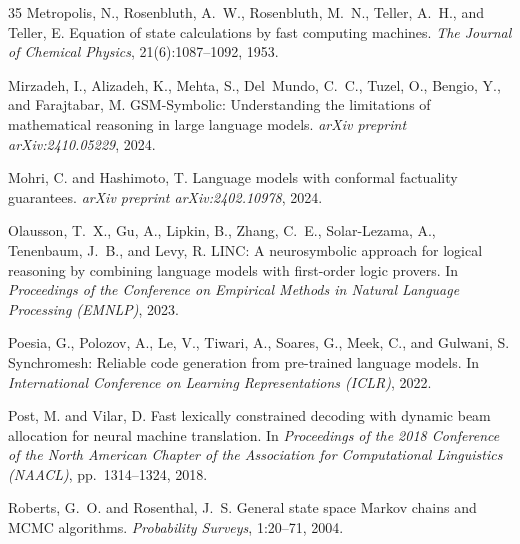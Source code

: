 \documentclass[twoside,11pt]{article}
\begin{document}
\begin{thebibliography}{35}
Metropolis, N., Rosenbluth, A.~W., Rosenbluth, M.~N., Teller, A.~H., and
Teller, E.
\newblock Equation of state calculations by fast computing machines.
\newblock \emph{The Journal of Chemical Physics}, 21(6):1087--1092, 1953.

Mirzadeh, I., Alizadeh, K., Mehta, S., Del~Mundo, C.~C., Tuzel, O.,
Bengio, Y., and Farajtabar, M.
\newblock GSM-Symbolic: Understanding the limitations of mathematical
reasoning in large language models.
\newblock \emph{arXiv preprint arXiv:2410.05229}, 2024.

Mohri, C. and Hashimoto, T.
\newblock Language models with conformal factuality guarantees.
\newblock \emph{arXiv preprint arXiv:2402.10978}, 2024.

Olausson, T.~X., Gu, A., Lipkin, B., Zhang, C.~E., Solar-Lezama, A.,
Tenenbaum, J.~B., and Levy, R.
\newblock LINC: A neurosymbolic approach for logical reasoning by combining
language models with first-order logic provers.
\newblock In \emph{Proceedings of the Conference on Empirical Methods in
Natural Language Processing (EMNLP)}, 2023.

Poesia, G., Polozov, A., Le, V., Tiwari, A., Soares, G., Meek, C., and
Gulwani, S.
\newblock Synchromesh: Reliable code generation from pre-trained language
models.
\newblock In \emph{International Conference on Learning Representations
(ICLR)}, 2022.

Post, M. and Vilar, D.
\newblock Fast lexically constrained decoding with dynamic beam allocation
for neural machine translation.
\newblock In \emph{Proceedings of the 2018 Conference of the North American
Chapter of the Association for Computational Linguistics (NAACL)}, pp.\
1314--1324, 2018.

Roberts, G.~O. and Rosenthal, J.~S.
\newblock General state space {M}arkov chains and {MCMC} algorithms.
\newblock \emph{Probability Surveys}, 1:20--71, 2004.


\end{thebibliography}
\end{document}
